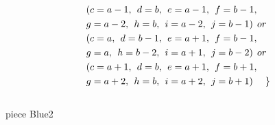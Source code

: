 \begin{align*}
&(c = a-1 ,\hspace{1ex}d = b,\hspace{1ex}e=a-1,\hspace{1ex}f=b-1,
\\&g=a-2,\hspace{1ex}h=b,\hspace{1ex}i=a-2,\hspace{1ex}j=b-1)\hspace{1ex} or \\
&(c = a ,\hspace{1ex}d = b-1,\hspace{1ex}e=a+1,\hspace{1ex}f=b-1,
\\&g=a,\hspace{1ex}h=b-2,\hspace{1ex}i=a+1,\hspace{1ex}j=b-2)\hspace{1ex} or \\
&(c = a+1 ,\hspace{1ex}d = b,\hspace{1ex}e=a+1,\hspace{1ex}f=b+1,
\\&g=a+2,\hspace{1ex}h=b,\hspace{1ex}i=a+2,\hspace{1ex}j=b+1)\hspace{3ex}\}
\end{align*}  
\\ piece Blue2 

